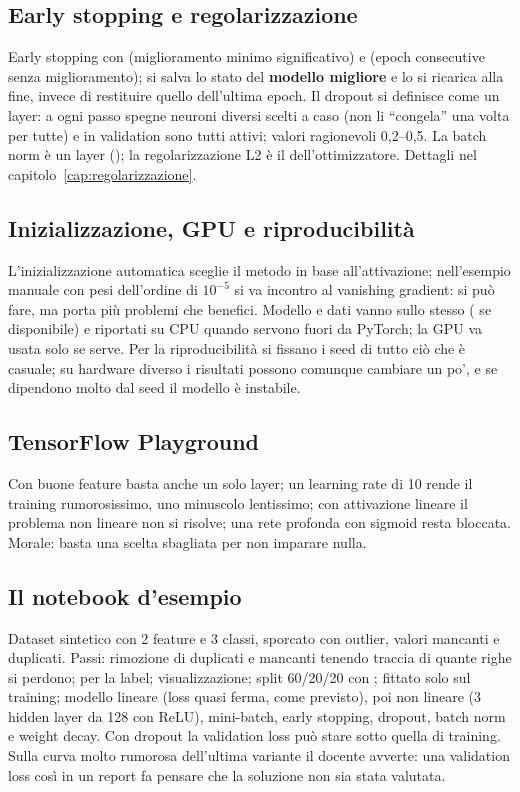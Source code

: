\subsection{Early stopping e regolarizzazione}
Early stopping con  (miglioramento minimo significativo) e  (epoch
consecutive senza miglioramento); si salva lo stato del \textbf{modello migliore} e lo si ricarica alla
fine, invece di restituire quello dell'ultima epoch. Il dropout si definisce come un layer: a ogni
passo spegne neuroni diversi scelti a caso (non li ``congela'' una volta per tutte) e in validation
sono tutti attivi; valori ragionevoli 0,2--0,5. La batch norm è un layer (); la
regolarizzazione L2 è il  dell'ottimizzatore. Dettagli nel
capitolo~\ref{cap:regolarizzazione}.

\subsection{Inizializzazione, GPU e riproducibilità}
L'inizializzazione automatica sceglie il metodo in base all'attivazione; nell'esempio manuale con
pesi dell'ordine di $10^{-5}$ si va incontro al vanishing gradient: si può fare, ma porta più
problemi che benefici. Modello e dati vanno sullo stesso  ( se disponibile) e
riportati su CPU quando servono fuori da PyTorch; la GPU va usata solo se serve. Per la
riproducibilità si fissano i seed di tutto ciò che è casuale; su hardware diverso i risultati possono
comunque cambiare un po', e se dipendono molto dal seed il modello è instabile.

\subsection{TensorFlow Playground}
Con buone feature basta anche un solo layer; un learning rate di 10 rende il training rumorosissimo,
uno minuscolo lentissimo; con attivazione lineare il problema non lineare non si risolve; una rete
profonda con sigmoid resta bloccata. Morale: basta una scelta sbagliata per non imparare nulla.

\subsection{Il notebook d'esempio}
Dataset sintetico con 2 feature e 3 classi, sporcato con outlier, valori mancanti e duplicati. Passi:
rimozione di duplicati e mancanti tenendo traccia di quante righe si perdono; 
per la label; visualizzazione; split 60/20/20 con ; 
fittato solo sul training; modello lineare (loss quasi ferma, come previsto), poi non lineare (3
hidden layer da 128 con ReLU), mini-batch, early stopping, dropout, batch norm e weight decay. Con
dropout la validation loss può stare sotto quella di training. Sulla curva molto rumorosa dell'ultima
variante il docente avverte: una validation loss così in un report fa pensare che la soluzione non sia
stata valutata.

